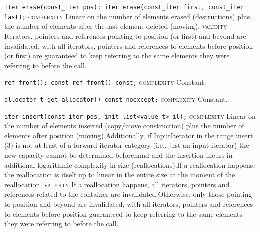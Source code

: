 \noindent{}\hspace*{0.25em}\lstinline[basicstyle=\ttfamily\color{corange}]{iter erase(const_iter pos); iter erase(const_iter first, const_iter last);} \textsc{complexity} Linear on the number of elements erased (destructions) plus the number of elements after the last element deleted (moving). \textsc{validity} Iterators, pointers and references pointing to position (or first) and beyond are invalidated, with all iterators, pointers and references to elements before position (or first) are guaranteed to keep referring to the same elements they were referring to before the call.\\\vspace{-0.6em}

\noindent{}\hspace*{0.25em}\lstinline[basicstyle=\ttfamily\color{cgreen}]{ref front(); const_ref front() const;} \textsc{complexity} Constant.\\\vspace{-0.6em}

\noindent{}\hspace*{0.25em}\lstinline[basicstyle=\ttfamily\color{cgreen}]{allocator_t get_allocator() const noexcept;} \textsc{complexity} Constant.\\\vspace{-0.6em}

\noindent{}\hspace*{0.25em}\lstinline[basicstyle=\ttfamily\color{corange}]{iter insert(const_iter pos, init_list<value_t> il);} \textsc{complexity} Linear on the number of elements inserted (copy/move construction) plus the number of elements after position (moving).Additionally, if InputIterator in the range insert (3) is not at least of a forward iterator category (i.e., just an input iterator) the new capacity cannot be determined beforehand and the insertion incurs in additional logarithmic complexity in size (reallocations).If a reallocation happens, the reallocation is itself up to linear in the entire size at the moment of the reallocation. \textsc{validity} If a reallocation happens, all iterators, pointers and references related to the container are invalidated.Otherwise, only those pointing to position and beyond are invalidated, with all iterators, pointers and references to elements before position guaranteed to keep referring to the same elements they were referring to before the call.\\\vspace{-0.6em}


